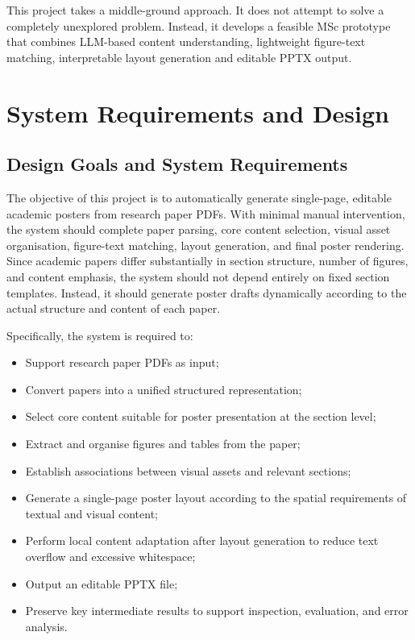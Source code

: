 \documentclass[12pt,oneside]{report}
\begin{document}
\vspace{1em}

This project takes a middle-ground approach. It does not attempt to solve a completely unexplored problem. Instead, it develops a feasible MSc prototype that combines LLM-based content understanding, lightweight figure-text matching, interpretable layout generation and editable PPTX output.


\chapter{System Requirements and Design}

\section{Design Goals and System Requirements}

The objective of this project is to automatically generate single-page, editable academic posters from research paper PDFs. With minimal manual intervention, the system should complete paper parsing, core content selection, visual asset organisation, figure-text matching, layout generation, and final poster rendering. Since academic papers differ substantially in section structure, number of figures, and content emphasis, the system should not depend entirely on fixed section templates. Instead, it should generate poster drafts dynamically according to the actual structure and content of each paper.

\vspace{1em}

Specifically, the system is required to:

\begin{itemize}
\item Support research paper PDFs as input;
\item Convert papers into a unified structured representation;
\item Select core content suitable for poster presentation at the section level;
\item Extract and organise figures and tables from the paper;
\item Establish associations between visual assets and relevant sections;
\item Generate a single-page poster layout according to the spatial requirements of textual and visual content;
\item Perform local content adaptation after layout generation to reduce text overflow and excessive whitespace;
\item Output an editable PPTX file;
\item Preserve key intermediate results to support inspection, evaluation, and error analysis.
\end{itemize}
\end{document}
